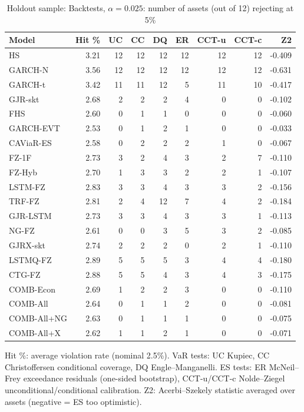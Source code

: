 \begin{table}[htbp]
\centering
\footnotesize
\caption{Holdout sample: Backtests, $\alpha=0.025$: number of assets (out of 12) rejecting at 5\%}
\label{tab:ho_bt_a025}
\begin{tabular}{lrrrrrrrr}
\toprule
Model & Hit \% & UC & CC & DQ & ER & CCT-u & CCT-c & Z2 \\
\midrule
HS & 3.21 & 12 & 12 & 12 & 12 & 12 & 12 & -0.409 \\
GARCH-N & 3.56 & 12 & 12 & 12 & 12 & 12 & 12 & -0.631 \\
GARCH-t & 3.42 & 11 & 11 & 12 & 5 & 11 & 10 & -0.417 \\
GJR-skt & 2.68 & 2 & 2 & 2 & 4 & 0 & 0 & -0.102 \\
FHS & 2.60 & 0 & 1 & 1 & 0 & 0 & 0 & -0.060 \\
GARCH-EVT & 2.53 & 0 & 1 & 2 & 1 & 0 & 0 & -0.033 \\
CAViaR-ES & 2.58 & 0 & 2 & 2 & 2 & 1 & 0 & -0.067 \\
FZ-1F & 2.73 & 3 & 2 & 4 & 3 & 2 & 7 & -0.110 \\
FZ-Hyb & 2.70 & 1 & 3 & 3 & 2 & 2 & 1 & -0.107 \\
LSTM-FZ & 2.83 & 3 & 3 & 4 & 3 & 3 & 2 & -0.156 \\
TRF-FZ & 2.81 & 2 & 4 & 12 & 7 & 4 & 2 & -0.184 \\
GJR-LSTM & 2.73 & 3 & 3 & 4 & 3 & 3 & 1 & -0.113 \\
NG-FZ & 2.61 & 0 & 0 & 3 & 5 & 3 & 2 & -0.085 \\
GJRX-skt & 2.74 & 2 & 2 & 2 & 0 & 2 & 1 & -0.110 \\
LSTMQ-FZ & 2.89 & 5 & 5 & 5 & 3 & 4 & 4 & -0.180 \\
CTG-FZ & 2.88 & 5 & 5 & 4 & 3 & 4 & 3 & -0.175 \\
COMB-Econ & 2.69 & 1 & 2 & 2 & 3 & 0 & 0 & -0.110 \\
COMB-All & 2.64 & 0 & 1 & 1 & 2 & 0 & 0 & -0.081 \\
COMB-All+NG & 2.63 & 0 & 1 & 1 & 1 & 0 & 0 & -0.075 \\
COMB-All+X & 2.62 & 1 & 1 & 2 & 1 & 0 & 0 & -0.071 \\
\bottomrule
\end{tabular}
\par\smallskip\parbox{\linewidth}{\scriptsize Hit \%: average violation rate (nominal 2.5\%). VaR tests: UC Kupiec, CC Christoffersen conditional coverage, DQ Engle--Manganelli. ES tests: ER McNeil--Frey exceedance residuals (one-sided bootstrap), CCT-u/CCT-c Nolde--Ziegel unconditional/conditional calibration. Z2: Acerbi--Szekely statistic averaged over assets (negative = ES too optimistic).}
\end{table}